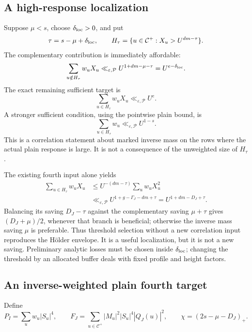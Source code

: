 \documentclass[11pt]{article}
\theoremstyle{definition}
\newcommand{\eps}{\varepsilon}
\newcommand{\Cplus}{\mathcal C^+}
\newcommand{\lls}{\ll_{\eps,\mathcal P}}
\begin{document}
\subsection{A high-response localization}

Suppose \(\mu<s\), choose \(\delta_{\rm loc}>0\), and put
\[
 \tau=s-\mu+\delta_{\rm loc},\qquad
 H_\tau=\{u\in\Cplus: X_u>U^{dm-\tau}\}.
\]
The complementary contribution is immediately affordable:
\begin{equation}
 \sum_{u\notin H_\tau}w_uX_u
    \lls U^{1+dm-\mu-\tau}=U^{e-\delta_{\rm loc}}.
 \label{eq:low-response-removal-direct}
\end{equation}
The exact remaining sufficient target is
\begin{equation}
 \sum_{u\in H_\tau}w_uX_u\lls U^e.
 \label{eq:exact-high-response-target}
\end{equation}
A stronger sufficient condition, using the pointwise plain bound, is
\begin{equation}
 \sum_{u\in H_\tau}w_u\lls U^{1-s}.
 \label{eq:strong-high-response-mass-target}
\end{equation}
This is a correlation statement about marked inverse mass on the rows
where the actual plain response is large.  It is not a consequence
of the unweighted size of \(H_\tau\).

The existing fourth input alone yields
\begin{align}
 \sum_{u\in H_\tau}w_uX_u
 &\le U^{-(dm-\tau)}
       \sum_u w_uX_u^2 \\
 &\lls U^{1+g-\Gamma_J-dm+\tau}
       =U^{1+dm-D_J+\tau}.
 \label{eq:fourth-high-response-bound}
\end{align}
Balancing its saving \(D_J-\tau\) against the complementary saving
\(\mu+\tau\) gives \((D_J+\mu)/2\), whenever that branch is
beneficial; otherwise the inverse mass saving \(\mu\) is preferable.
Thus threshold selection without a new correlation input reproduces
the Hölder envelope.  It is a useful localization, but it is not a
new saving.  Preliminary analytic losses must be chosen inside
\(\delta_{\rm loc}\); changing the threshold by an allocated buffer deals with
fixed profile and height factors.

\subsection{An inverse-weighted plain fourth target}

Define
\begin{equation}
 P_I=\sum_u w_u|S_u|^4,\qquad
 F_J=\sum_{u\in\Cplus}|M_u|^2|S_u|^4|Q_J(u)|^2,
 \qquad \chi=(2s-\mu-D_J)_+.
 \label{eq:inverse-fourth-definitions}
\end{equation}
\end{document}
